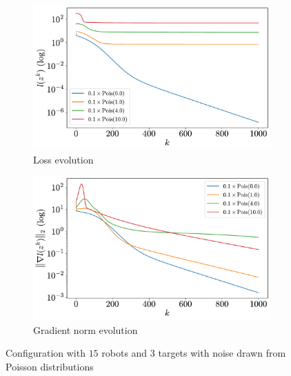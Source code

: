 \documentclass[a4paper,11pt,oneside]{book}
\begin{document}
\begin{figure}[H]
      \centering
      \begin{subfigure}[t]{0.49\textwidth}
            \centering
            \includegraphics[width=\linewidth]{./figs/tracking/loss_poisson_15_3_2_1000.pdf} 
            \caption{Loss evolution}
      \end{subfigure}
      \hfill
      \begin{subfigure}[t]{0.49\textwidth}
            \centering
            \includegraphics[width=\linewidth]{./figs/tracking/gradient_poisson_15_3_2_1000.pdf} 
            \caption{Gradient norm evolution}
      \end{subfigure}
      \caption{Configuration with $15$ robots and $3$ targets with noise drawn from Poisson distributions}
      \label{fig:tracking_poisson_15_3}
\end{figure}
\end{document}
